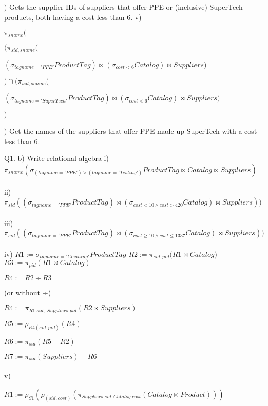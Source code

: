 \documentclass[10pt]{article}
\newcommand\tab[1][1cm]{\hspace*{#1}}
\begin{document}
$)$
\break \break
Gets the supplier IDs of suppliers that offer PPE or (inclusive) SuperTech products, both having a cost less than 6.
\break \break
v)

$\pi_{sname} ($

\tab $(\pi_{sid, sname} ($

\tab \tab $(\sigma_{tagname='PPE'}ProductTag)\bowtie(\sigma_{cost<6}Catalog)\bowtie Suppliers)$

\tab $) \cap (\pi_{sid, sname} ($

\tab \tab $(\sigma_{tagname='SuperTech'}ProductTag)\bowtie(\sigma_{cost<6}Catalog)\bowtie Suppliers)$

\tab $)$

$)$
\break \break
Get the names of the suppliers that offer PPE made up SuperTech with a cost less than 6.

\break \break

Q1. b) Write relational algebra
\break \break
i) $\pi_{sname}(\sigma_{(tagname='PPE') \vee (tagname ='Testing')}ProductTag \bowtie Catalog \bowtie Suppliers)$
\\~\\
ii) $\pi_{sid}((\sigma_{tagname='PPE'}ProductTag) \bowtie (\sigma_{cost<10 \wedge cost>420}Catalog) \bowtie Suppliers))$
\\~\\
iii)
$\pi_{sid}((\sigma_{tagname='PPE'}ProductTag) \bowtie (\sigma_{cost\geq 10 \wedge cost \leq 1337}Catalog) \bowtie Suppliers))\;$
\\~\\
iv)
\newline
$R1 := \sigma_{tagname='Cleaning'}ProductTag$
\newline
$R2 := \pi_{sid, pid}(R1 \bowtie Catalog$)
\newline
$R3 := \pi_{pid}(R1 \bowtie Catalog)$

$R4 := R2\div R3$
\newline

(or without $\div$)

$R4 := \pi_{R1.sid,\; Suppliers.pid}(R2 \times Suppliers)$

$R5 := \rho_{R4(sid, pid)}(R4)$

$R6 := \pi_{sid}(R5 - R2)$

$R7 := \pi_{sid}(Suppliers) - R6$
\\~\\
v)

$R1 := \rho_{S1}(\rho_{(sid, cost)}(\pi_{Suppliers.sid, Catalog.cost}(Catalog \bowtie Product)))$
\end{document}
